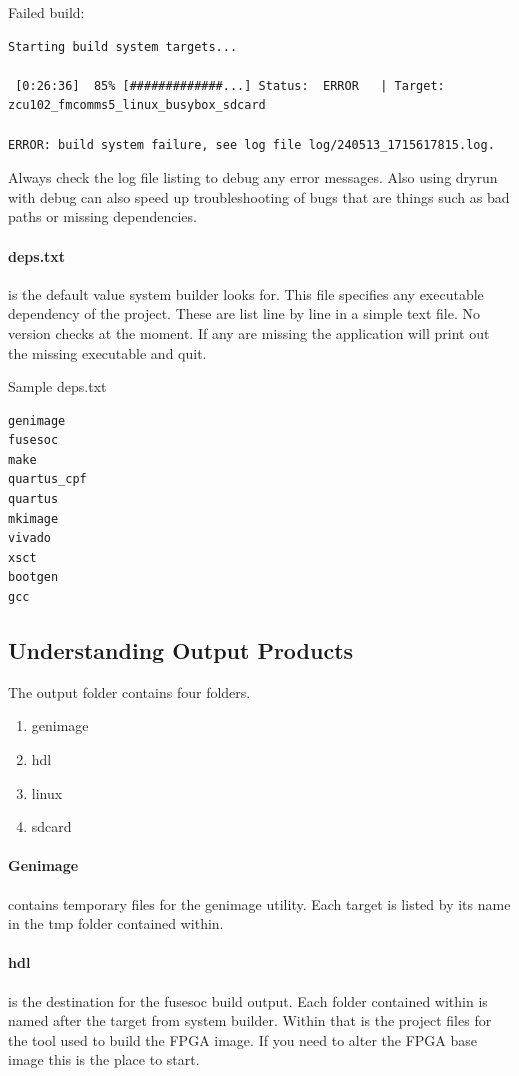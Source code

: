 \par
Failed build:
\begin{lstlisting}[language={}]
Starting build system targets...

 [0:26:36]  85% [#############...] Status:  ERROR   | Target: zcu102_fmcomms5_linux_busybox_sdcard

ERROR: build system failure, see log file log/240513_1715617815.log.
\end{lstlisting}
Always check the log file listing to debug any error messages. Also using \textendash dryrun with \textendash debug can also speed up troubleshooting
of bugs that are things such as bad paths or missing dependencies.

\paragraph{deps.txt} is the default value system builder looks for. This file specifies any executable dependency of the project.
These are list line by line in a simple text file. No version checks at the moment. If any are missing the application will print out
the missing executable and quit.

Sample deps.txt
\begin{lstlisting}[language={}]
genimage
fusesoc
make
quartus_cpf
quartus
mkimage
vivado
xsct
bootgen
gcc
\end{lstlisting}

\subsection{Understanding Output Products}

\par
The output folder contains four folders.
\begin{enumerate}
\item genimage
\item hdl
\item linux
\item sdcard
\end{enumerate}

\paragraph{Genimage} contains temporary files for the genimage utility. Each target is listed by its name in the tmp folder contained within.

\paragraph{hdl} is the destination for the fusesoc build output. Each folder contained within is named after the target from system builder.
Within that is the project files for the tool used to build the FPGA image. If you need to alter the FPGA base image this is the place to start.

